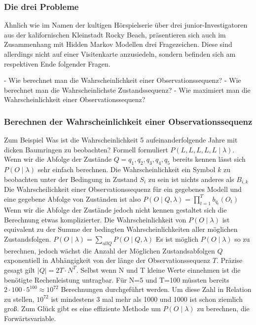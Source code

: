 \subsubsection{Die drei Probleme}
Ähnlich wie im Namen der kultigen Hörspielserie über drei junior-Investigatoren aus der kalifornischen Kleinstadt Rocky Beach, präsentieren sich auch im Zusammenhang mit Hidden Markov Modellen drei Fragezeichen. Diese sind allerdings nicht auf einer Visitenkarte anzusiedeln, sondern befinden sich am respektiven Ende folgender Fragen.

- Wie berechnet man die Wahrscheinlichkeit einer Observationssequenz?
- Wie berechnet man die Wahrscheinlichste Zustandssequenz?
- Wie maximiert man die Wahrscheinlichkeit einer Observationssequenz?

\subsubsection{Berechnen der Wahrscheinlichkeit einer Observationssequenz}
Zum Beispiel Was ist die Wahrscheinlichkeit 5 aufeinanderfolgende Jahre mit dicken Baumringen zu beobachten? Formell formuliert $P({L, L, L, L, L} \mid \lambda)$.
Wenn wir die Abfolge der Zustände $Q={q_1, q_2, q_3, q_4, q_5}$ bereits kennen lässt sich $P(O \mid \lambda)$
sehr einfach berechnen. Die Wahrscheinlichkeit ein Symbol $k$ zu beobachten 
unter der Bedingung in Zustand $S_i$ zu sein ist nichts anderes als $B_{i,k}$
Die Wahrscheilichkeit einer Observationssequenz für ein gegebenes Modell und eine gegebene Abfolge von Zuständen ist also
$P(O \mid Q, \lambda) =  \prod_{t=1}^{T} b_{q_t}(O_t)$
Wenn wir die Abfolge der Zustände jedoch nicht kennen gestaltet sich die Berechnung etwas komplizierter.
Die Wahrscheinlichkeit von $P(O \mid \lambda)$ ist equivalent zu der 
Summe der bedingten Wahrscheinlichkeiten aller möglichen Zustandsfolgen.
$P(O \mid \lambda) = \sum_{all Q} P(O \mid Q, \lambda )$
Es ist möglich $P(O \mid \lambda)$ so zu berechnen, jedoch wächst die 
Anzahl der Möglichen Zustandsabfolgen $Q$ exponentiell in Abhängigkeit von der länge der Observationssequenz $T$.
Präzise gesagt gilt $|Q| = 2T \cdot N^T$. Selbst wenn N und T kleine Werte einnehmen
ist die benötigte Rechenleistung untragbar. Für N=5 und T=100
müssten bereits $2 \cdot 100 \cdot 5^{100} \approx 10^{72}$ Berechnungen durchgeführt werden.
Um diese Zahl in Relation zu stellen, $10^{72}$ ist mindestens 3 mal mehr als 1000 und 1000 ist schon ziemlich groß.
Zum Glück gibt es eine effiziente Methode um $P(O \mid \lambda)$ zu berechnen, die Forwärtsvariable.

